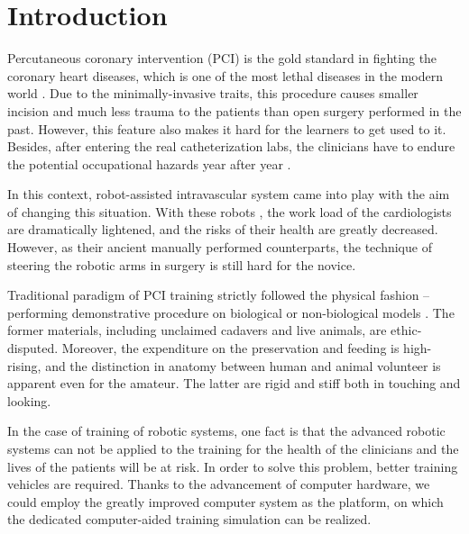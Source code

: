 \section{Introduction}
\label{sec6_0}

Percutaneous coronary intervention (PCI) is the gold standard in fighting the coronary heart diseases, which is one of the most lethal diseases in the modern world \cite{WHO2013}. %
Due to the minimally-invasive traits, this procedure causes smaller incision and much less trauma to the patients than open surgery performed in the past.
However, this feature also makes it hard for the learners to get used to it.
Besides, after entering the real catheterization labs, the clinicians have to endure the potential occupational hazards year after year \cite{Smilowitz2012}.

In this context, robot-assisted intravascular system came into play with the aim of changing this situation.
With these robots \cite{Beyar2006RNS,Smilowitz2012}, the work load of the cardiologists are dramatically lightened, and the risks of their health are greatly decreased.
However, as their ancient manually performed counterparts, the technique of steering the robotic arms in surgery is still hard for the novice.

Traditional paradigm of PCI training strictly followed the physical fashion -- performing demonstrative procedure on biological or non-biological models \cite{Lunderquist1995,Mori1998}. %
The former materials, including unclaimed cadavers and live animals, are ethic-disputed.
Moreover, the expenditure on the preservation and feeding is high-rising, and the distinction in anatomy between human and animal volunteer is apparent even for the amateur. %
The latter are rigid and stiff both in touching and looking.

In the case of training of robotic systems, one fact is that the advanced robotic systems can not be applied to the training for the health of the clinicians and the lives of the patients will be at risk. %
In order to solve this problem, better training vehicles are required.
Thanks to the advancement of computer hardware, we could employ the greatly improved computer system as the platform, on which the dedicated computer-aided training simulation can be realized. %

